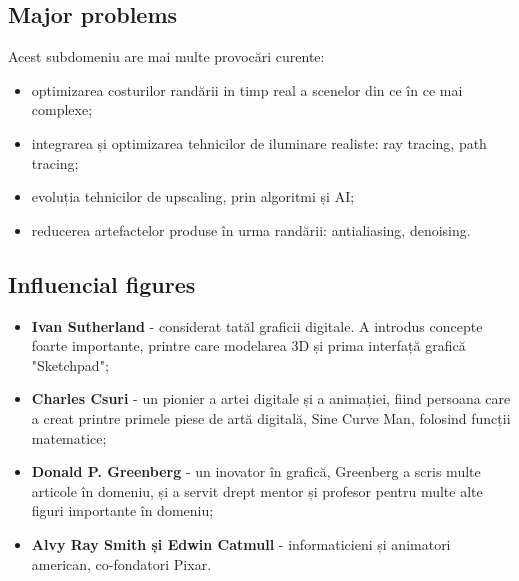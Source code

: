\documentclass[12pt, letterpaper]{article}
\begin{document}
\subsection*{Major problems}
Acest subdomeniu are mai multe provocări curente:
\begin{itemize}
    \item optimizarea costurilor randării in timp real a scenelor din ce în ce mai complexe;
    \item integrarea și optimizarea tehnicilor de iluminare realiste: ray tracing, path tracing;
    \item evoluția tehnicilor de upscaling, prin algoritmi și AI;
    \item reducerea artefactelor produse în urma randării: antialiasing, denoising.
\end{itemize}


\subsection*{Influencial figures}
\begin{itemize}
    \item \textbf{Ivan Sutherland} - considerat tatăl graficii digitale. A introdus concepte foarte importante, printre care modelarea 3D și prima interfață grafică "Sketchpad";
    \item \textbf{Charles Csuri} - un pionier a artei digitale și a animației, fiind persoana care a creat printre primele piese de artă digitală, Sine Curve Man, folosind funcții matematice;
    \item \textbf{Donald P. Greenberg} - un inovator în grafică, Greenberg a scris multe articole în domeniu, și a servit drept mentor și profesor pentru multe alte figuri importante în domeniu;
    \item \textbf{Alvy Ray Smith și Edwin Catmull} - informaticieni și animatori american, co-fondatori Pixar.
\end{itemize}
\end{document}
